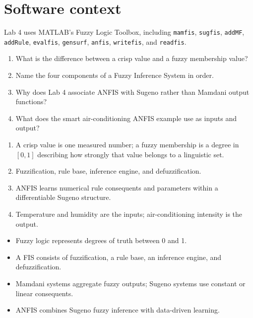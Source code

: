 \section{Software context}

Lab 4 uses MATLAB's Fuzzy Logic Toolbox, including \texttt{mamfis}, \texttt{sugfis}, \texttt{addMF}, \texttt{addRule}, \texttt{evalfis}, \texttt{gensurf}, \texttt{anfis}, \texttt{writefis}, and \texttt{readfis}.



\begin{quickcheck}
\begin{enumerate}
  \item What is the difference between a crisp value and a fuzzy membership value?
  \item Name the four components of a Fuzzy Inference System in order.
  \item Why does Lab 4 associate ANFIS with Sugeno rather than Mamdani output functions?
  \item What does the smart air-conditioning ANFIS example use as inputs and output?
\end{enumerate}
\end{quickcheck}

\begin{checkanswers}
\begin{enumerate}
  \item A crisp value is one measured number; a fuzzy membership is a degree in \([0,1]\) describing how strongly that value belongs to a linguistic set.
  \item Fuzzification, rule base, inference engine, and defuzzification.
  \item ANFIS learns numerical rule consequents and parameters within a differentiable Sugeno structure.
  \item Temperature and humidity are the inputs; air-conditioning intensity is the output.
\end{enumerate}
\end{checkanswers}

\begin{chapterrecap}
\begin{itemize}
  \item Fuzzy logic represents degrees of truth between 0 and 1.
  \item A FIS consists of fuzzification, a rule base, an inference engine, and defuzzification.
  \item Mamdani systems aggregate fuzzy outputs; Sugeno systems use constant or linear consequents.
  \item ANFIS combines Sugeno fuzzy inference with data-driven learning.
\end{itemize}
\end{chapterrecap}
